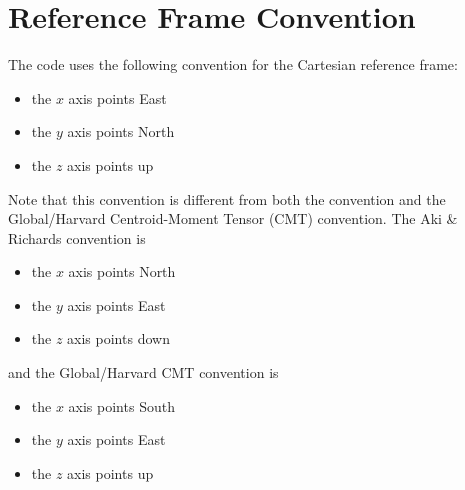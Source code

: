 \chapter{Reference Frame Convention}\label{cha:Reference-Frame-Convention}

The code uses the following convention for the Cartesian reference frame:

\begin{itemize}
\item the $x$ axis points East
\item the $y$ axis points North
\item the $z$ axis points up
\end{itemize}
Note that this convention is different from both the \citet{AkRi80}
convention and the Global/Harvard Centroid-Moment Tensor (CMT) convention.
The Aki \& Richards convention is

\begin{itemize}
\item the $x$ axis points North
\item the $y$ axis points East
\item the $z$ axis points down
\end{itemize}
and the Global/Harvard CMT convention is

\begin{itemize}
\item the $x$ axis points South
\item the $y$ axis points East
\item the $z$ axis points up
\end{itemize}



